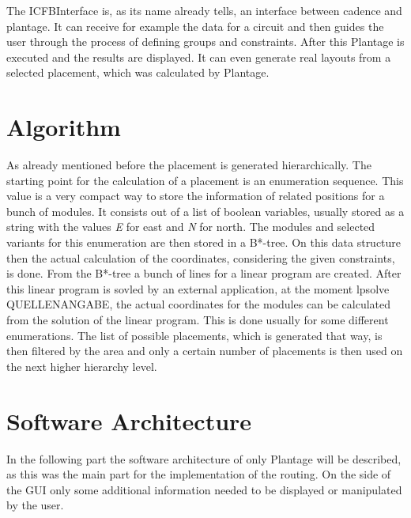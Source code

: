 The ICFBInterface is, as its name already tells, an interface between cadence and plantage. It can receive for example the data for a circuit and then guides the user through the process of defining groups and constraints. After this Plantage is executed and the results are displayed. It can even generate real layouts from a selected placement, which was calculated by Plantage.

\section{Algorithm}
As already mentioned before the placement is generated hierarchically. The starting point for the calculation of a placement is an enumeration sequence. This value is a very compact way to store the information of related positions for a bunch of modules. It consists out of a list of boolean variables, usually stored as a string with the values \textit{E} for east and \textit{N} for north. The modules and selected variants for this enumeration are then stored in a B*-tree. On this data structure then the actual calculation of the coordinates, considering the given constraints, is done. From the B*-tree a bunch of lines for a linear program are created. After this linear program is sovled by an external application, at the moment lpsolve QUELLENANGABE, the actual coordinates for the modules can be calculated from the solution of the linear program. This is done usually for some different enumerations. The list of possible placements, which is generated that way, is then filtered by the area and only a certain number of placements is then used on the next higher hierarchy level.

\section{Software Architecture}
In the following part the software architecture of only Plantage will be described, as this was the main part for the implementation of the routing. On the side of the GUI only some additional information needed to be displayed or manipulated by the user.

